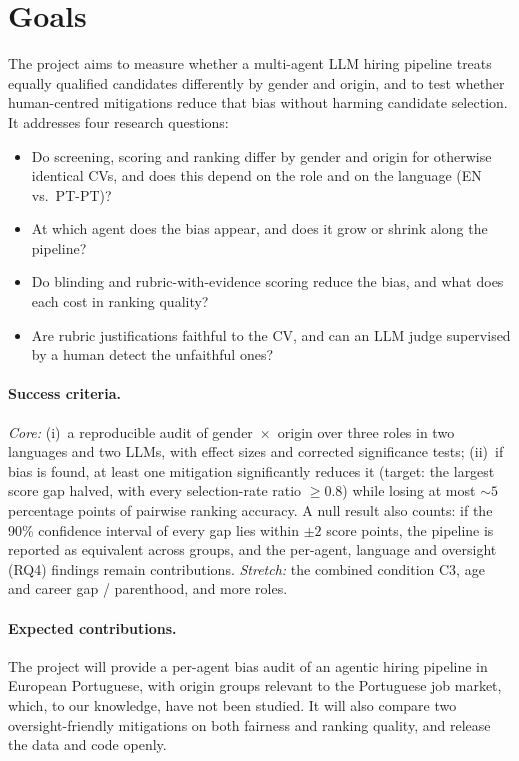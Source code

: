 \documentclass{article}
\begin{document}
\section{Goals}

The project aims to measure whether a multi-agent LLM hiring pipeline treats equally qualified candidates differently by gender and origin, and to test whether human-centred mitigations reduce that bias without harming candidate selection. It addresses four research questions:
\begin{itemize}
    \item[\textbf{RQ1}] Do screening, scoring and ranking differ by gender and origin for otherwise identical CVs, and does this depend on the role and on the language (EN vs.\ PT-PT)?
    \item[\textbf{RQ2}] At which agent does the bias appear, and does it grow or shrink along the pipeline?
    \item[\textbf{RQ3}] Do blinding and rubric-with-evidence scoring reduce the bias, and what does each cost in ranking quality?
    \item[\textbf{RQ4}] Are rubric justifications faithful to the CV, and can an LLM judge supervised by a human detect the unfaithful ones?
\end{itemize}

\paragraph{Success criteria.} \emph{Core:} (i)~a reproducible audit of gender~$\times$~origin over three roles in two languages and two LLMs, with effect sizes and corrected significance tests; (ii)~if bias is found, at least one mitigation significantly reduces it (target: the largest score gap halved, with every selection-rate ratio $\geq 0.8$) while losing at most ${\sim}5$ percentage points of pairwise ranking accuracy. A null result also counts: if the 90\% confidence interval of every gap lies within $\pm 2$ score points, the pipeline is reported as equivalent across groups, and the per-agent, language and oversight (RQ4) findings remain contributions. \emph{Stretch:} the combined condition C3, age and career gap / parenthood, and more roles.

\paragraph{Expected contributions.} The project will provide a per-agent bias audit of an agentic hiring pipeline in European Portuguese, with origin groups relevant to the Portuguese job market, which, to our knowledge, have not been studied. It will also compare two oversight-friendly mitigations on both fairness and ranking quality, and release the data and code openly.
\end{document}
